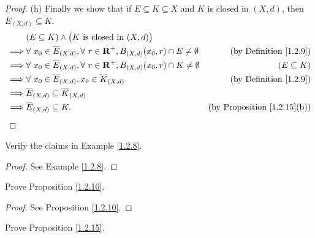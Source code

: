 \begin{proof}{(h)}
    Finally we show that if \(E \subseteq K \subseteq X\) and \(K\) is closed in \((X, d)\), then \(\overline{E}_{(X, d)} \subseteq K\).
    \begin{align*}
                 & (E \subseteq K) \land \big(K \text{ is closed in } (X, d)\big)                                                                                          \\
        \implies & \forall\ x_0 \in \overline{E}_{(X, d)}, \forall\ r \in \mathbf{R}^+, B_{(X, d)}(x_0, r) \cap E \neq \emptyset & \text{(by Definition \ref{1.2.9})}      \\
        \implies & \forall\ x_0 \in \overline{E}_{(X, d)}, \forall\ r \in \mathbf{R}^+, B_{(X, d)}(x_0, r) \cap K \neq \emptyset & (E \subseteq K)                         \\
        \implies & \forall\ x_0 \in \overline{E}_{(X, d)}, x_0 \in \overline{K}_{(X, d)}                                         & \text{(by Definition \ref{1.2.9})}      \\
        \implies & \overline{E}_{(X, d)} \subseteq \overline{K}_{(X, d)}                                                                                                   \\
        \implies & \overline{E}_{(X, d)} \subseteq K.                                                                            & \text{(by Proposition \ref{1.2.15}(b))}
    \end{align*}
\end{proof}

\exercisesection

\begin{exercise}\label{ex 1.2.1}
    Verify the claims in Example \ref{1.2.8}.
\end{exercise}

\begin{proof}
    See Example \ref{1.2.8}.
\end{proof}

\begin{exercise}\label{ex 1.2.2}
    Prove Proposition \ref{1.2.10}.
\end{exercise}

\begin{proof}
    See Proposition \ref{1.2.10}.
\end{proof}

\begin{exercise}\label{ex 1.2.3}
    Prove Proposition \ref{1.2.15}.
\end{exercise}

